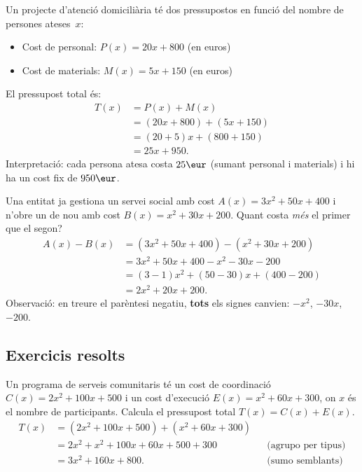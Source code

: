 \begin{exemple}
Un projecte d'atenció domiciliària té dos pressupostos en funció del nombre de
persones ateses~$x$:
\begin{itemize}[leftmargin=1.4em, itemsep=2pt]
  \item Cost de personal: $P(x) = 20x + 800$ (en euros)
  \item Cost de materials: $M(x) = 5x + 150$ (en euros)
\end{itemize}
El pressupost total és:
\begin{align*}
T(x) &= P(x) + M(x) \\
     &= (20x + 800) + (5x + 150) \\
     &= (20+5)x + (800+150) \\
     &= 25x + 950.
\end{align*}
Interpretació: cada persona atesa costa $25\eur$ (sumant personal i materials)
i hi ha un cost fix de $950\eur$.
\end{exemple}

\begin{exemple}
Una entitat ja gestiona un servei social amb cost $A(x) = 3x^2 + 50x + 400$ i
n'obre un de nou amb cost $B(x) = x^2 + 30x + 200$. Quant costa \emph{més}
el primer que el segon?
\begin{align*}
A(x) - B(x) &= (3x^2 + 50x + 400) - (x^2 + 30x + 200) \\
             &= 3x^2 + 50x + 400 - x^2 - 30x - 200 \\
             &= (3-1)x^2 + (50-30)x + (400-200) \\
             &= 2x^2 + 20x + 200.
\end{align*}
Observació: en treure el parèntesi negatiu, \textbf{tots} els signes canvien:
$-x^2$, $-30x$, $-200$.
\end{exemple}

\subsection{Exercicis resolts}

\begin{exresolt}
Un programa de serveis comunitaris té un cost de coordinació
$C(x) = 2x^2 + 100x + 500$ i un cost d'execució $E(x) = x^2 + 60x + 300$,
on $x$ és el nombre de participants. Calcula el pressupost total $T(x) = C(x) + E(x)$.
\solucio
\begin{align*}
T(x) &= (2x^2 + 100x + 500) + (x^2 + 60x + 300) \\
     &= 2x^2 + x^2 + 100x + 60x + 500 + 300
       &&\text{(agrupo per tipus)} \\
     &= 3x^2 + 160x + 800.
       &&\text{(sumo semblants)}
\end{align*}
\end{exresolt}

